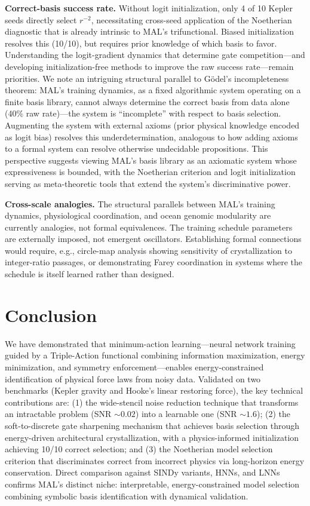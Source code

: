 \documentclass[9pt,twocolumn,twoside]{pnas-new}
\begin{document}
\textbf{Correct-basis success rate.} Without logit initialization, only 4 of 10 Kepler seeds directly select $r^{-2}$, necessitating cross-seed application of the Noetherian diagnostic that is already intrinsic to MAL's trifunctional. Biased initialization resolves this (10/10), but requires prior knowledge of which basis to favor. Understanding the logit-gradient dynamics that determine gate competition---and developing initialization-free methods to improve the raw success rate---remain priorities. We note an intriguing structural parallel to G{\"o}del's incompleteness theorem: MAL's training dynamics, as a fixed algorithmic system operating on a finite basis library, cannot always determine the correct basis from data alone (40\% raw rate)---the system is ``incomplete'' with respect to basis selection. Augmenting the system with external axioms (prior physical knowledge encoded as logit bias) resolves this underdetermination, analogous to how adding axioms to a formal system can resolve otherwise undecidable propositions. This perspective suggests viewing MAL's basis library as an axiomatic system whose expressiveness is bounded, with the Noetherian criterion and logit initialization serving as meta-theoretic tools that extend the system's discriminative power.

\textbf{Cross-scale analogies.} The structural parallels between MAL's training dynamics, physiological coordination, and ocean genomic modularity are currently analogies, not formal equivalences. The training schedule parameters are externally imposed, not emergent oscillators. Establishing formal connections would require, e.g., circle-map analysis showing sensitivity of crystallization to integer-ratio passages, or demonstrating Farey coordination in systems where the schedule is itself learned rather than designed.

\section*{Conclusion}
We have demonstrated that minimum-action learning---neural network training guided by a Triple-Action functional combining information maximization, energy minimization, and symmetry enforcement---enables energy-constrained identification of physical force laws from noisy data. Validated on two benchmarks (Kepler gravity and Hooke's linear restoring force), the key technical contributions are: (1) the wide-stencil noise reduction technique that transforms an intractable problem (SNR $\sim 0.02$) into a learnable one (SNR $\sim 1.6$); (2) the soft-to-discrete gate sharpening mechanism that achieves basis selection through energy-driven architectural crystallization, with a physics-informed initialization achieving 10/10 correct selection; and (3) the Noetherian model selection criterion that discriminates correct from incorrect physics via long-horizon energy conservation. Direct comparison against SINDy variants, HNNs, and LNNs confirms MAL's distinct niche: interpretable, energy-constrained model selection combining symbolic basis identification with dynamical validation.
\end{document}
